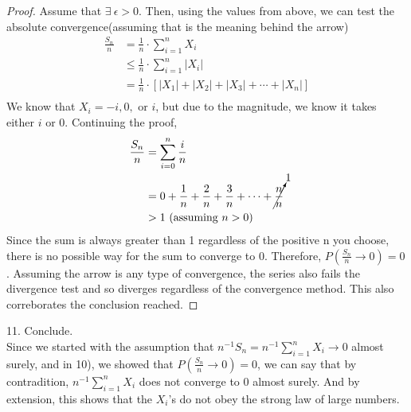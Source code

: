 \documentclass[11pt]{article}
\begin{document}
\begin{proof}
	Assume that $\exists~\epsilon > 0$. Then, using the values from above, we can test the absolute convergence(assuming that is the meaning behind the arrow)
	\begin{align*}
		\frac{S_n}{n} &= \frac{1}{n} \cdot \sum_{i=1}^{n} X_i \\
		&\le \frac{1}{n} \cdot \sum_{i=1}^{n} \left| X_i \right| \\
		&= \frac{1}{n} \cdot \left[ \left| X_1 \right| + \left| X_2 \right| + \left| X_3 \right| + \cdots + \left| X_n \right| \right]\\
	\end{align*}
	We know that $X_i = -i, 0, \text{ or } i$, but due to the magnitude, we know it takes either $i$ or 0. Continuing the proof, 
	\begin{align*}
		\frac{S_n}{n} &= \sum_{i = 0}^{n} \frac{i}{n} \\
		&=  0 + \frac{1}{n} + \frac{2}{n} + \frac{3}{n} + \cdots + \cancelto{1}{\frac{n}{n}} \\
		&> 1 \text{ (assuming $n > 0$)} \\
	\end{align*} 
	Since the sum is always greater than 1 regardless of the positive n you choose, there is no possible way for the sum to converge to 0. 
	Therefore, $P \left( \frac{S_n}{n} \to 0 \right) = 0$. Assuming the arrow is any type of convergence, the series also fails the divergence test and so diverges regardless of the convergence method. This also correborates the conclusion reached. 
\end{proof}
11. Conclude. \\
Since we started with the assumption that $n^{-1} S_n = n^{-1} \sum_{i=1}^{n} X_i \to 0$ almost surely, and in 10), we showed that $P(\frac{S_n}{n} \to 0) = 0$,
we can say that by contradition, $n^{-1}\sum_{i=1}^{n}X_i$ does not converge to 0 almost surely. And by extension, this shows that the $X_i$'s do not obey the strong law of large numbers.
\end{document}
